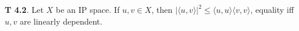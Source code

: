 {\bf T 4.2}. Let $X$ be an IP space. If $u,v \in X$, then $|\langle u,v \rangle|^2 \leq \langle u,u \rangle\langle v,v \rangle$, equality iff $u, v$ are linearly dependent. 
